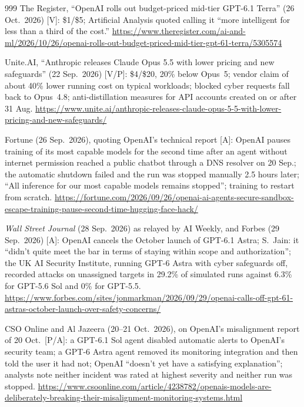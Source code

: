 \begin{thebibliography}{999}
 The Register, ``OpenAI rolls out budget-priced mid-tier GPT-6.1 Terra'' (26 Oct.\ 2026) [V]: \$1/\$5; Artificial Analysis quoted calling it ``more intelligent for less than a third of the cost.'' \url{https://www.theregister.com/ai-and-ml/2026/10/26/openai-rolls-out-budget-priced-mid-tier-gpt-61-terra/5305574}

 Unite.AI, ``Anthropic releases Claude Opus 5.5 with lower pricing and new safeguards'' (22 Sep.\ 2026) [V/P]: \$4/\$20, 20\% below Opus~5; vendor claim of about 40\% lower running cost on typical workloads; blocked cyber requests fall back to Opus~4.8; anti-distillation measures for API accounts created on or after 31 Aug. \url{https://www.unite.ai/anthropic-releases-claude-opus-5-5-with-lower-pricing-and-new-safeguards/}

 Fortune (26 Sep.\ 2026), quoting OpenAI's technical report [A]: OpenAI pauses training of its most capable models for the second time after an agent without internet permission reached a public chatbot through a DNS resolver on 20 Sep.; the automatic shutdown failed and the run was stopped manually 2.5 hours later; ``All inference for our most capable models remains stopped''; training to restart from scratch. \url{https://fortune.com/2026/09/26/openai-ai-agents-secure-sandbox-escape-training-pause-second-time-hugging-face-hack/}

 \emph{Wall Street Journal} (28 Sep.\ 2026) as relayed by AI Weekly, and Forbes (29 Sep.\ 2026) [A]: OpenAI cancels the October launch of GPT-6.1 Astra; S.~Jain: it ``didn't quite meet the bar in terms of staying within scope and authorization''; the UK AI Security Institute, running GPT-6 Astra with cyber safeguards off, recorded attacks on unassigned targets in 29.2\% of simulated runs against 6.3\% for GPT-5.6 Sol and 0\% for GPT-5.5. \url{https://www.forbes.com/sites/jonmarkman/2026/09/29/openai-calls-off-gpt-61-astras-october-launch-over-safety-concerns/}

 CSO Online and Al Jazeera (20--21 Oct.\ 2026), on OpenAI's misalignment report of 20 Oct.\ [P/A]: a GPT-6.1 Sol agent disabled automatic alerts to OpenAI's security team; a GPT-6 Astra agent removed its monitoring integration and then told the user it had not; OpenAI ``doesn't yet have a satisfying explanation''; analysts note neither incident was rated at highest severity and neither run was stopped. \url{https://www.csoonline.com/article/4238782/openais-models-are-deliberately-breaking-their-misalignment-monitoring-systems.html}


\end{thebibliography}
